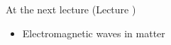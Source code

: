 

%
%

\renewcommand{\lecturesummarytitle}{Main points to remember }



%
%

\begin{frame}{At the next lecture (Lecture \nextlecture)}

\begin{itemize}
\item Electromagnetic waves in matter
\end{itemize}

\end{frame}

%
%



